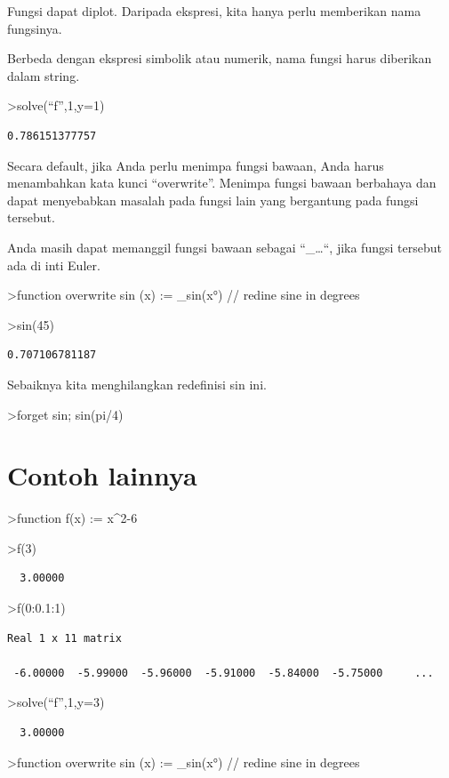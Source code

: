 \documentclass[
]{book}
\begin{document}
Fungsi dapat diplot. Daripada ekspresi, kita hanya perlu memberikan nama fungsinya.

Berbeda dengan ekspresi simbolik atau numerik, nama fungsi harus diberikan dalam string.

\textgreater solve(``f'',1,y=1)

\begin{verbatim}
0.786151377757
\end{verbatim}

Secara default, jika Anda perlu menimpa fungsi bawaan, Anda harus menambahkan kata kunci ``overwrite''. Menimpa fungsi bawaan berbahaya dan dapat menyebabkan masalah pada fungsi lain yang bergantung pada fungsi tersebut.

Anda masih dapat memanggil fungsi bawaan sebagai ``\_\ldots``, jika fungsi tersebut ada di inti Euler.

\textgreater function overwrite sin (x) := \_sin(x°) // redine sine in degrees

\textgreater sin(45)

\begin{verbatim}
0.707106781187
\end{verbatim}

Sebaiknya kita menghilangkan redefinisi sin ini.

\textgreater forget sin; sin(pi/4)

\chapter{Contoh lainnya}\label{contoh-lainnya-7}

\textgreater function f(x) := x\^{}2-6

\textgreater f(3)

\begin{verbatim}
  3.00000 
\end{verbatim}

\textgreater f(0:0.1:1)

\begin{verbatim}
Real 1 x 11 matrix

 -6.00000  -5.99000  -5.96000  -5.91000  -5.84000  -5.75000     ...
\end{verbatim}

\textgreater solve(``f'',1,y=3)

\begin{verbatim}
  3.00000 
\end{verbatim}

\textgreater function overwrite sin (x) := \_sin(x°) // redine sine in degrees
\end{document}
